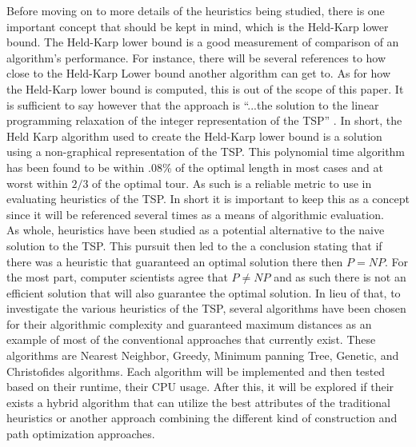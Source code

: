 \documentclass[midd]{thesis}
\newcommand{\tab}{\hspace*{2em}}
\begin{document}
\tab Before moving on to more details of the heuristics being studied, there is one important concept that should be kept in mind, which is the Held-Karp lower bound. The Held-Karp lower bound is a good measurement of comparison of an algorithm's performance. For instance, there will be several references to how close to the Held-Karp Lower bound another algorithm can get to. As for how the Held-Karp lower bound is computed, this is out of the scope of this paper. It is sufficient to say however that the approach is ``...the solution to the linear programming relaxation of the integer representation of the TSP'' \cite{htspc}. In short, the Held Karp algorithm used to create the Held-Karp lower bound is a solution using a non-graphical representation of the TSP. This polynomial time algorithm has been found to be within .08\% of  the optimal length in most cases and at worst within $2/3$ of the optimal tour. As such is a reliable metric to use in evaluating heuristics of the TSP. In short it is important to keep this as a concept since it will be referenced several times as a means of algorithmic evaluation.\\
\tab As whole, heuristics have been studied as a potential alternative to the naive solution to the TSP. This pursuit then led to the a conclusion stating that if there was a heuristic that guaranteed an optimal solution there then $P = NP$. For the most  part, computer scientists agree that $P \neq NP$ and as such there is not an efficient solution that will also guarantee the optimal solution. In lieu of that, to investigate the various heuristics of the TSP, several algorithms have been chosen for their algorithmic complexity and guaranteed maximum distances as an example of most of the conventional approaches that currently exist. These algorithms are Nearest Neighbor, Greedy, Minimum panning Tree, Genetic, and Christofides algorithms. Each algorithm will be implemented and then tested based on their runtime, their CPU usage. After this, it will be explored if their exists a hybrid algorithm that can utilize the best attributes of the traditional heuristics or another approach combining the different kind of construction and path optimization approaches.\\
\end{document}
